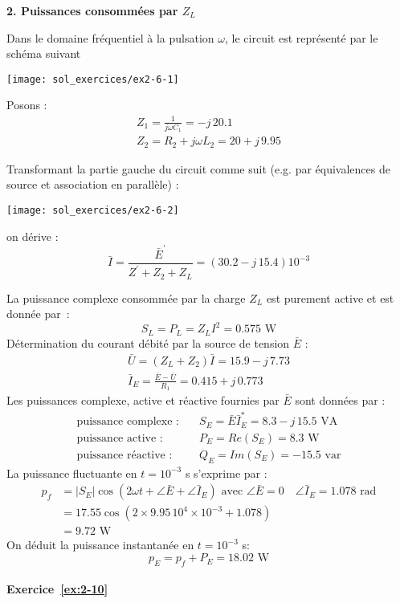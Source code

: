 {\bf 2. Puissances consommées par $Z_L$}

Dans le domaine fréquentiel à la pulsation $\omega$, le circuit
est représenté par le schéma suivant
\begin{center}
	\texttt{[image: sol\_exercices/ex2-6-1]} 
\end{center}

Posons :
\begin{gather*}
	Z_1=\frac{1}{j\omega C_1}=-j\, 20.1 \\
	Z_2=R_2+j\omega L_2=20+j\, 9.95
\end{gather*}

Transformant la partie gauche du circuit comme suit (e.g. par équivalences de source et association en parallèle) :
\begin{center}
\texttt{[image: sol\_exercices/ex2-6-2]}
\end{center}
on dérive :
\[\bar{I}=\frac{\bar{E}^{'}}{Z^{'}+Z_2+Z_L}=(30.2-j\, 15.4)10^{-3}\]

La puissance complexe  consommée par la charge $Z_L$ est purement
active et est donnée par~:
\[S_L=P_L=Z_LI^2=0.575 \text{~W}\]
Détermination du courant débité par la source de tension $\bar E$ :
\begin{gather*}
	\bar{U}=(Z_L+Z_2)\bar{I}=15.9-j\, 7.73\\
	\bar{I}_E= \frac{\bar{E}-\bar{U}}{R_1}=0.415+j\, 0.773
\end{gather*}
Les puissances complexe, active et réactive  fournies par $\bar E$ sont données par :
\begin{align*}
	\text{puissance complexe :}\quad & S_E=\bar{E}\bar{I}_E^*=8.3-j \,
	15.5\text{~VA}\\
	\text{puissance active :}\quad & P_E=Re(S_E)=8.3 \text{~W}\\
	\text{puissance réactive :}\quad & Q_E=Im(S_E)=-15.5 \text{~var}
\end{align*}
La puissance fluctuante en $t=10^{-3}$ s s'exprime par :
\begin{align*}
	p_f& =|S_E|\cos(2\omega t + \angle \bar{E}+\angle \bar{I}_E)
	\text{~avec~} \angle \bar{E}=0 \quad \angle \bar{I}_E=1.078
	\text{~rad}\\
	& = 17.55\cos(2\times 9.95\, 10^4\times 10^{-3}+1.078)\\
	& = 9.72 \text{~W}
\end{align*}
On déduit la puissance instantanée en $t=10^{-3}$ s:
\[p_E=p_f+P_E=18.02 \text{~W}\]


\paragraph{Exercice~\ref{ex:2-10}}~\\%

